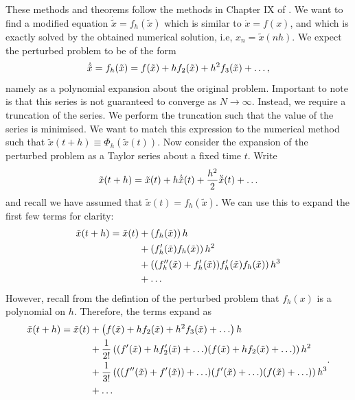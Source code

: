 \documentclass{report}
\theoremstyle{exampstyle} \newtheorem{example}[theorem]{Example}
\theoremstyle{exampstyle} \newtheorem{remark}[theorem]{Remark}
\theoremstyle{exampstyle} \newtheorem{definition}[theorem]{Definition}
\theoremstyle{exampstyle} \newtheorem{lemma}[theorem]{Lemma}
\theoremstyle{exampstyle} \newtheorem{proposition}[theorem]{Proposition}
\begin{document}
These methods and theorems follow the methods in Chapter IX of \cite{gni2006}.
We want to find a modified equation $\dot{\tilde{x}} = f_h (\tilde{x})$ which is similar to $\dot{x} = f(x)$,
and which is exactly solved by the obtained numerical solution, i.e, $x_n = \tilde{x}(nh)$.
We expect the perturbed problem to be of the form
\begin{equation*}
	\dot{\tilde{x}} = f_h(\tilde{x}) = f(\tilde{x}) + h f_2(\tilde{x}) + h^2 f_3(\tilde{x}) + \mathellipsis,
\end{equation*}
namely as a polynomial expansion about the original problem. Important to note is that this series is not guaranteed to converge as $N \rightarrow \infty$.
Instead, we require a truncation of the series.
We perform the truncation such that the value of the series is minimised.
We want to match this expression to the numerical method such that $\tilde{x}(t+h) \equiv \Phi_h(\tilde{x}(t))$.
Now consider the expansion of the perturbed problem as a Taylor series about a fixed time $t$. Write
\begin{equation*}
	\tilde{x}(t+h) = \tilde{x}(t) + h \dot{\tilde{x}}(t) + \frac{h^2}{2} \ddot{\tilde{x}}(t) + \mathellipsis
\end{equation*}
and recall we have assumed that $\tilde{x}(t) = f_h(\tilde{x})$.
We can use this to expand the first few terms for clarity:
\begin{equation*}
	\begin{aligned}
		\tilde{x}(t+h) = \tilde{x}(t) &+ \left(
			f_h(\tilde{x})
		\right)h \\
		&+ \left(
			f'_h(\tilde{x})f_h(\tilde{x})
		\right)h^2 \\
		&+ \left(
			(f''_h(\tilde{x})+f'_h(\tilde{x}))f'_h(\tilde{x})f_h(\tilde{x})
		\right)h^3 \\
		&+ \mathellipsis
	\end{aligned}
\end{equation*}
However, recall from the defintion of the perturbed problem that $f_h(x)$ is a polynomial on $h$.
Therefore, the terms expand as
\begin{equation*}
	\begin{aligned}
		\tilde{x}(t+h) = \tilde{x}(t) &+ \left(
			f(\tilde{x}) + h f_2(\tilde{x}) + h^2 f_3(\tilde{x}) + \mathellipsis
 		\right)h \\
		&+ \frac{1}{2!}\left(
			(f'(\tilde{x}) + h f'_2(\tilde{x})  + \mathellipsis)
			(f(\tilde{x}) + h f_2(\tilde{x}) + \mathellipsis)
		\right)h^2 \\
		&+ \frac{1}{3!}\left(
			((f''(\tilde{x}) + f'(\tilde{x})) + \mathellipsis)
			(f'(\tilde{x}) + \mathellipsis)
			(f(\tilde{x}) + \mathellipsis)
		\right)h^3 \\
		&+ \mathellipsis
	\end{aligned}.
\end{equation*}
\end{document}
